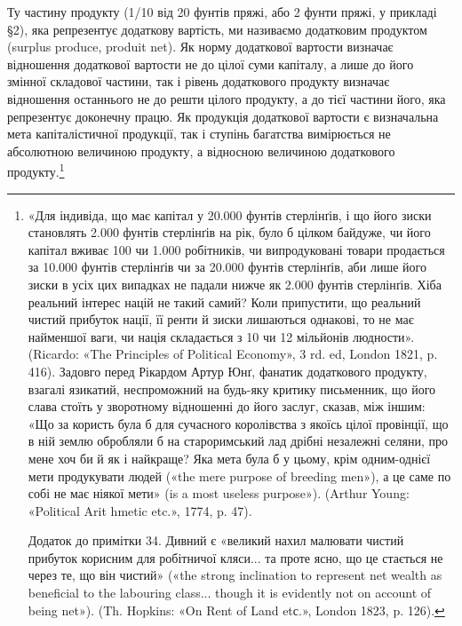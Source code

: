 Ту частину продукту (1/10 від 20 фунтів пряжі, або 2 фунти пряжі, у прикладі §2), яка репрезентує
додаткову вартість, ми
називаємо додатковим продуктом (surplus produce, produit net). Як норму додаткової вартости визначає
відношення додаткової
вартости не до цілої суми капіталу, а лише до його змінної складової частини, так і рівень
додаткового продукту визначає відношення останнього не до решти цілого продукту, а до тієї частини
його, яка репрезентує доконечну працю. Як продукція додаткової вартости є визначальна мета
капіталістичної продукції, так і ступінь багатства вимірюється не абсолютною величиною
продукту, а відносною величиною додаткового продукту.\footnote{
«Для індивіда, що має капітал у 20.000 фунтів стерлінґів, і що його зиски становлять 2.000 фунтів
стерлінґів на рік, було б цілком байдуже, чи його капітал вживає 100 чи 1.000 робітників, чи
випродуковані товари продається за 10.000 фунтів стерлінґів чи за 20.000 фунтів стерлінґів, аби лише
його зиски в усіх цих випадках не падали нижче як 2.000 фунтів
стерлінґів. Хіба реальний інтерес націй не такий самий? Коли припустити, що реальний чистий прибуток
нації, її ренти й зиски лишаються однакові, то не має найменшої ваги, чи нація складається з 10 чи
12 мільйонів людности». (Ricardo: «The Principles of Political Economy», 3 rd. ed, London 1821, p.
416). Задовго перед Рікардом Артур Юнґ, фанатик додаткового продукту, взагалі язикатий, неспроможний
на будь-яку критику письменник, що його слава стоїть у зворотному відношенні
до його заслуг, сказав, між іншим: «Що за користь була б для сучасного королівства з якоїсь цілої
провінції, що в ній землю обробляли б на староримський лад дрібні незалежні селяни, про мене хоч би
й як і найкраще? Яка мета була б у цьому, крім одним-однієї мети продукувати людей
(«the mere purpose of breeding men»), а це саме по собі не має ніякої мети» (is a most useless
purpose»). (Arthur Young: «Political Arit hmetic etc.», 1774, p. 47).

Додаток до примітки 34. Дивний є «великий нахил малювати чистий прибуток корисним для робітничої
кляси... та проте ясно, що це стається не через те, що він чистий» («the strong inclination to
represent net wealth as beneficial to the labouring class... though it is evidently not on account
of being net»). (Th. Hopkins: «On Rent of Land etс.», London 1823, p. 126).
}
